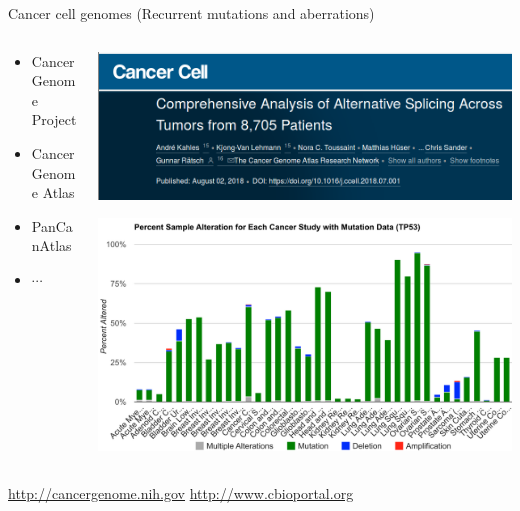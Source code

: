 \documentclass[10pt]{beamer}
\begin{document}
\begin{frame}{Cancer cell genomes (Recurrent mutations and aberrations)}
	\begin{columns}
		\begin{column}{0.3\textwidth}
			\begin{itemize}
				\item  Cancer Genome Project 
				\item  Cancer Genome Atlas 
				\item  PanCanAtlas
				\item $\cdots$
			\end{itemize}
		\end{column}
		\begin{column}{0.7\textwidth}
			\begin{center}
				\includegraphics[width=\textwidth]{./figures/canceraltsplicing.png}
			\end{center}
			\begin{center}
				\includegraphics[width=\textwidth]{./figures/p53.png}
			\end{center}
		\end{column}
	\end{columns}
	\url{http://cancergenome.nih.gov} \hfill \url{http://www.cbioportal.org} 
\end{frame}

\end{document}
